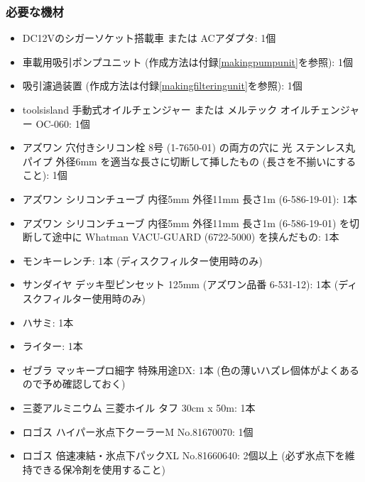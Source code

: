 \documentclass[titlepage,10pt,a4paper]{jsbook}
\begin{document}
\subsubsection{必要な機材}
\begin{itemize}
\item DC12Vのシガーソケット搭載車 または ACアダプタ: 1個
\item 車載用吸引ポンプユニット (作成方法は付録\ref{makingpumpunit}を参照): 1個
\item 吸引濾過装置 (作成方法は付録\ref{makingfilteringunit}を参照): 1個
\item toolsisland 手動式オイルチェンジャー または メルテック オイルチェンジャー OC-060: 1個
\item アズワン 穴付きシリコン栓 8号 (1-7650-01) の両方の穴に 光 ステンレス丸パイプ 外径6mm を適当な長さに切断して挿したもの (長さを不揃いにすること): 1個
\item アズワン シリコンチューブ 内径5mm 外径11mm 長さ1m (6-586-19-01): 1本
\item アズワン シリコンチューブ 内径5mm 外径11mm 長さ1m (6-586-19-01) を切断して途中に Whatman VACU-GUARD (6722-5000) を挟んだもの: 1本
\item モンキーレンチ: 1本 (ディスクフィルター使用時のみ)
\item サンダイヤ デッキ型ピンセット 125mm (アズワン品番 6-531-12): 1本 (ディスクフィルター使用時のみ)
\item ハサミ: 1本
\item ライター: 1本
\item ゼブラ マッキープロ細字 特殊用途DX: 1本 (色の薄いハズレ個体がよくあるので予め確認しておく)
\item 三菱アルミニウム 三菱ホイル タフ 30cm x 50m: 1本
\item ロゴス ハイパー氷点下クーラーM No.81670070: 1個
\item ロゴス 倍速凍結・氷点下パックXL No.81660640: 2個以上 (必ず氷点下を維持できる保冷剤を使用すること)
\end{itemize}
\end{document}
